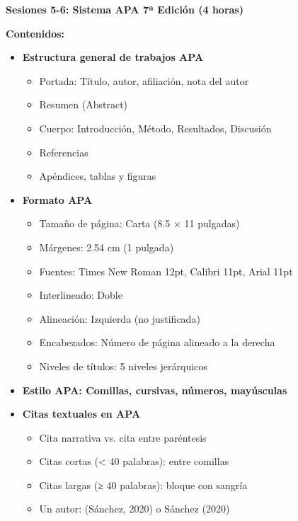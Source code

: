 \documentclass[12pt,a4paper]{yaac-luatex}
\newcommand{\subsecciontitulo}[1]{
	{\color{maincolor}\large\bfseries #1}
}
\begin{document}
	\vspace{0.3cm}
	
	\begin{tcolorbox}[
		enhanced,
		colback=white,
		colframe=curso2color,
		arc=3pt,
		boxrule=1.5pt,
		left=10pt,
		right=10pt,
		top=8pt,
		bottom=8pt,
		breakable
		]
		\subsecciontitulo{Sesiones 5-6: Sistema APA 7ª Edición (4 horas)}
		
		\textbf{Contenidos:}
		\begin{itemize}[leftmargin=*, itemsep=0.1cm]
			\item \textbf{Estructura general de trabajos APA}
			\begin{itemize}
				\item Portada: Título, autor, afiliación, nota del autor
				\item Resumen (Abstract)
				\item Cuerpo: Introducción, Método, Resultados, Discusión
				\item Referencias
				\item Apéndices, tablas y figuras
			\end{itemize}
			\item \textbf{Formato APA}
			\begin{itemize}
				\item Tamaño de página: Carta (8.5 × 11 pulgadas)
				\item Márgenes: 2.54 cm (1 pulgada)
				\item Fuentes: Times New Roman 12pt, Calibri 11pt, Arial 11pt
				\item Interlineado: Doble
				\item Alineación: Izquierda (no justificada)
				\item Encabezados: Número de página alineado a la derecha
				\item Niveles de títulos: 5 niveles jerárquicos
			\end{itemize}
			\item \textbf{Estilo APA: Comillas, cursivas, números, mayúsculas}
			\item \textbf{Citas textuales en APA}
			\begin{itemize}
				\item Cita narrativa vs. cita entre paréntesis
				\item Citas cortas (< 40 palabras): entre comillas
				\item Citas largas (≥ 40 palabras): bloque con sangría
				\item Un autor: (Sánchez, 2020) o Sánchez (2020)

\end{itemize}
\end{itemize}
\end{tcolorbox}
\end{document}
